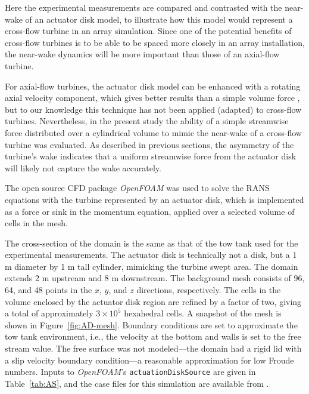 Here the experimental measurements are compared and contrasted with the
near-wake of an actuator disk model, to illustrate how this model would
represent a cross-flow turbine in an array simulation. Since one of the
potential benefits of cross-flow turbines is to be able to be spaced more
closely in an array installation, the near-wake dynamics will be more important
than those of an axial-flow turbine.

For axial-flow turbines, the actuator disk model can be enhanced with a rotating
axial velocity component, which gives better results than a simple volume force
\cite{Wu2011}, but to our knowledge this technique has not been applied
(adapted) to cross-flow turbines. Nevertheless, in the present study the
ability of a simple streamwise force distributed over a cylindrical volume to
mimic the near-wake of a cross-flow turbine was evaluated. As described in
previous sections, the asymmetry of the turbine's wake indicates that a uniform
streamwise force from the actuator disk will likely not capture the wake
accurately.


The open source CFD package \textit{OpenFOAM} was used to solve the RANS
equations with the turbine represented by an actuator disk, which is
implemented as a force or sink in the momentum equation, applied over a selected
volume of cells in the mesh.

The cross-section of the domain is the same as that of the tow tank used for the
experimental measurements. The actuator disk is technically not a disk, but a 1
m diameter by 1 m tall cylinder, mimicking the turbine swept area. The domain
extends 2 m upstream and 8 m downstream.  The background mesh consists of 96,
64, and 48 points in the $x$, $y$, and $z$ directions, respectively. The cells
in the volume enclosed by the actuator disk region are refined by a factor of
two, giving a total of  approximately $3 \times 10^5$ hexahedral cells. A
snapshot of the mesh is shown in Figure~\ref{fig:AD-mesh}. Boundary conditions
are set to approximate the tow tank environment, i.e., the velocity at the
bottom and walls is set to the free stream value. The free surface was not
modeled---the domain had a rigid lid with a slip velocity boundary condition---a
reasonable approximation for low Froude numbers. Inputs to \textit{OpenFOAM}'s
\texttt{actuationDiskSource} are given in Table~\ref{tab:AS}, and the case files
for this simulation are available from \cite{Bachant2014-OF-AS-case-files}.

